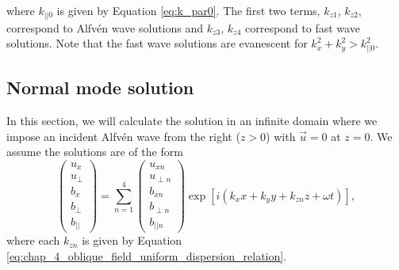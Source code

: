 where $k_{||0}$ is given by Equation \eqref{eq:k_par0}.
The first two terms, $k_{z1}$, $k_{z2}$, correspond to Alfv\'en wave solutions and $k_{z3}$, $k_{z4}$ correspond to fast wave solutions. Note that the fast wave solutions are evanescent for $k_x^2+k_y^2>k_{||0}^2$.

\subsection{Normal mode solution}

In this section, we will calculate the solution in an infinite domain where we impose an incident Alfv\'en wave from the right ($z>0$) with $\vec{u}=0$ at $z=0$. We assume the solutions are of the form 
\begin{equation}
    \label{eq:chap_4_uniform_density_full_soln}
    \begin{pmatrix}
    u_x \\
    u_\perp \\
    b_x \\
    b_\perp \\
    b_{||}
    \end{pmatrix}
    =\sum_{n=1}^4 \begin{pmatrix}
    u_{xn}\\
    u_{\perp n} \\
    b_{xn} \\
    b_{\perp n} \\
    b_{|| n}
    \end{pmatrix}
    \exp[i(k_x x + k_y y + k_{zn} z + \omega t)],
\end{equation}
where each $k_{zn}$ is given by Equation \eqref{eq:chap_4_oblique_field_uniform_dispersion_relation}.

